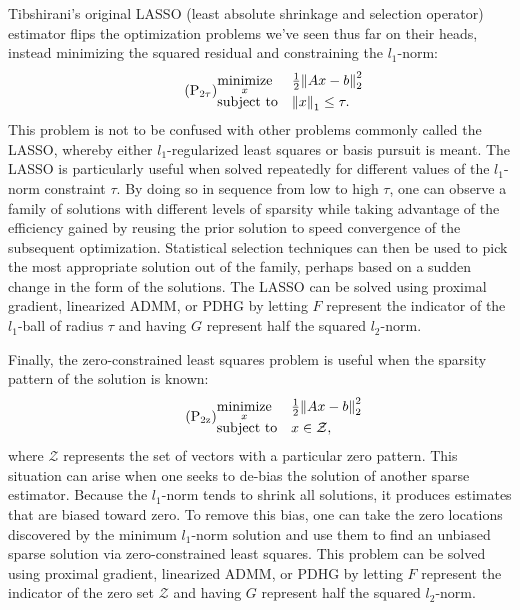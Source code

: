 Tibshirani's original LASSO (least absolute shrinkage and selection operator) estimator \autocite{Tib96} flips the optimization problems we've seen thus far on their heads, instead minimizing the squared residual and constraining the $l_1$-norm:
\begin{equation*}\tag{$\text{P}_{\text{2}\tau}$}
 \begin{matrix*}[l]
  \underset{x}{\mathrm{minimize}} & \frac{1}{2}\norm{2}{Ax - b}^2\\
  \text{subject to} & \norm{1}{x} \le \tau.
 \end{matrix*}
\end{equation*}
This problem is not to be confused with other problems commonly called the LASSO, whereby either $l_1$-regularized least squares or basis pursuit is meant. The LASSO is particularly useful when solved repeatedly for different values of the $l_1$-norm constraint $\tau$. By doing so in sequence from low to high $\tau$, one can observe a family of solutions with different levels of sparsity while taking advantage of the efficiency gained by reusing the prior solution to speed convergence of the subsequent optimization. Statistical selection techniques can then be used to pick the most appropriate solution out of the family, perhaps based on a sudden change in the form of the solutions. The LASSO can be solved using proximal gradient, linearized ADMM, or PDHG by letting $F$ represent the indicator of the $l_1$-ball of radius $\tau$ and having $G$ represent half the squared $l_2$-norm.

Finally, the zero-constrained least squares problem is useful when the sparsity pattern of the solution is known:
\begin{equation*}\tag{$\text{P}_{\text{2z}}$}
 \begin{matrix*}[l]
  \underset{x}{\mathrm{minimize}} & \frac{1}{2}\norm{2}{Ax - b}^2\\
  \text{subject to} & x \in \mathcal{Z},
 \end{matrix*}
\end{equation*}
where $\mathcal{Z}$ represents the set of vectors with a particular zero pattern. This situation can arise when one seeks to de-bias the solution of another sparse estimator. Because the $l_1$-norm tends to shrink all solutions, it produces estimates that are biased toward zero. To remove this bias, one can take the zero locations discovered by the minimum $l_1$-norm solution and use them to find an unbiased sparse solution via zero-constrained least squares. This problem can be solved using proximal gradient, linearized ADMM, or PDHG by letting $F$ represent the indicator of the zero set $\mathcal{Z}$ and having $G$ represent half the squared $l_2$-norm.